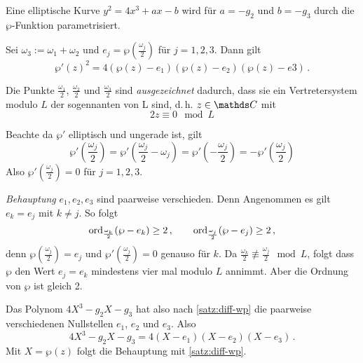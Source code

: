 \begin{beme}
Eine elliptische Kurve $y^2=4x^3+ax-b$ wird für $a=-g_2$ und $b=-g_3$ durch die $\wp$-Funktion parametrisiert.
\end{beme}

\begin{koro}
Sei $\omega_3 := \omega_1 + \omega_2$ und $e_j = \wp(\frac{\omega_j}{2})$ für $j=1,2,3$.
Dann gilt
\[
	\wp'(z)^2 = 4(\wp(z)-e_1)(\wp(z)-e_2)(\wp(z)-e3)
	\,.
\]
\end{koro}

\begin{beme}
Die Punkte $\frac{\omega_1}{2}$, $\frac{\omega_2}{2}$ und $\frac{\omega_3}{2}$ sind \emph{ausgezeichnet} dadurch, dass sie ein Vertretersystem modulo $L$ der sogennanten  von L sind, d.\,h. $z\in\CC$ mit
\[
	2z \equiv 0 \mod L
\]
\end{beme}

\begin{bewe}
Beachte da $\wp'$ elliptisch und ungerade ist, gilt
\[
	\wp'\left(\frac{\omega_j}{2}\right)
	= \wp'\left(\frac{\omega_j}{2}-\omega_j\right)
	= \wp'\left(-\frac{\omega_j}{2}\right)
	= - \wp'\left(\frac{\omega_j}{2}\right)
\]
Also $\wp'(\frac{\omega_j}{2}) = 0$ für $j=1,2,3$.

\emph{Behauptung}
$e_1, e_2, e_3$ sind paarweise verschieden.
Denn Angenommen es gilt $e_k = e_j$ mit $k \not= j$.
So folgt
\[
	{\textstyle \operatorname*{ord}_{\frac{\omega_k}{2}}} (\wp-e_k) \geq 2
	\,,\qquad
	{\textstyle \operatorname*{ord}_{\frac{\omega_j}{2}}} (\wp-e_j) \geq 2
	\,,
\]
denn $\wp(\frac{\omega_j}{2}) = e_j$ und $\wp'(\frac{\omega_j}{2}) = 0$ genauso für $k$.
Da $\frac{\omega_k}{2} \not\equiv \frac{\omega_j}{2} \mod L$, folgt dass $\wp$ den Wert $e_j = e_k$ mindestens vier mal modulo $L$ annimmt.
Aber die Ordnung von $\wp$ ist gleich 2. \blitz

Das Polynom $4X^3-g_2X-g_3$ hat also nach \autoref{satz:diff-wp} die paarweise verschiedenen Nullstellen $e_1$, $e_2$ und $e_3$.
Also
\[
	4X^3-g_2X-g_3 = 4(X-e_1)(X-e_2)(X-e_3)
	\,.
\]
Mit $X = \wp(z)$ folgt die Behauptung mit \autoref{satz:diff-wp}.
\end{bewe}

